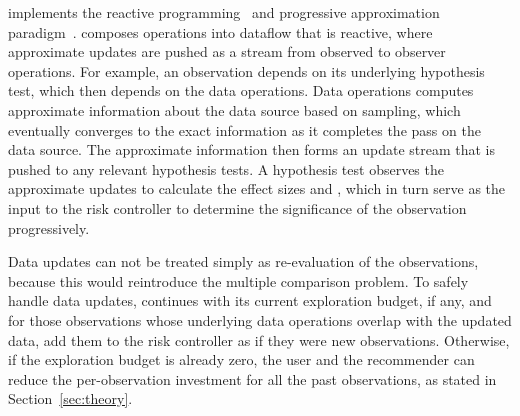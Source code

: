\system{} implements the reactive programming~\cite{wan2000functional} and progressive approximation paradigm~\cite{vizdom, zgraggen2016progressive}. \system{} composes operations into dataflow that is reactive, where approximate updates are pushed as a stream from observed to observer operations. For example, an observation depends on its underlying hypothesis test, which then depends on the data operations. Data operations computes approximate information about the data source based on sampling, which eventually converges to the exact information as it completes the pass on the data source. The approximate information then forms an update stream that is pushed to any relevant hypothesis tests. A hypothesis test observes the approximate updates to calculate the effect sizes and \pvals{}, which in turn serve as the input to the risk controller to determine the significance of the observation progressively. 

Data updates can not be treated simply as re-evaluation of the observations, because this would reintroduce the multiple comparison problem.  To safely handle data updates, \system{} continues with its current exploration budget, if any, and for those observations whose underlying data operations overlap with the updated data, add them to the risk controller as if they were new observations.  Otherwise, if the exploration budget is already zero, the user and the recommender can reduce the per-observation investment for all the past observations, as stated in Section~\ref{sec:theory}.

